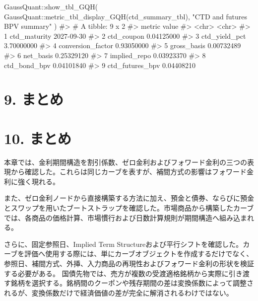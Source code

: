 \documentclass[
  letterpaper,
  DIV=11,
  numbers=noendperiod]{scrreprt}
\newenvironment{Shaded}{\begin{snugshade}}{\end{snugshade}}
\newcommand{\CommentTok}[1]{\textcolor[rgb]{0.37,0.37,0.37}{#1}}
\newcommand{\FunctionTok}[1]{\textcolor[rgb]{0.28,0.35,0.67}{#1}}
\newcommand{\NormalTok}[1]{\textcolor[rgb]{0.00,0.23,0.31}{#1}}
\newcommand{\SpecialCharTok}[1]{\textcolor[rgb]{0.37,0.37,0.37}{#1}}
\newcommand{\StringTok}[1]{\textcolor[rgb]{0.13,0.47,0.30}{#1}}
\begin{document}
\begin{Shaded}
\begin{Highlighting}[]
\NormalTok{GaussQuant}\SpecialCharTok{::}\FunctionTok{show\_tbl\_GQH}\NormalTok{(}
\NormalTok{  GaussQuant}\SpecialCharTok{::}\FunctionTok{metric\_tbl\_display\_GQH}\NormalTok{(ctd\_summary\_tbl),}
  \StringTok{"CTD and futures BPV summary"}
\NormalTok{)}
\CommentTok{\#\textgreater{} \# A tibble: 9 x 2}
\CommentTok{\#\textgreater{}   metric            value     }
\CommentTok{\#\textgreater{}   \textless{}chr\textgreater{}             \textless{}chr\textgreater{}     }
\CommentTok{\#\textgreater{} 1 ctd\_maturity      2027{-}09{-}30}
\CommentTok{\#\textgreater{} 2 ctd\_coupon        0.04125000}
\CommentTok{\#\textgreater{} 3 ctd\_yield\_pct     3.70000000}
\CommentTok{\#\textgreater{} 4 conversion\_factor 0.93050000}
\CommentTok{\#\textgreater{} 5 gross\_basis       0.00732489}
\CommentTok{\#\textgreater{} 6 net\_basis         0.25329120}
\CommentTok{\#\textgreater{} 7 implied\_repo      0.03923370}
\CommentTok{\#\textgreater{} 8 ctd\_bond\_bpv      0.04101840}
\CommentTok{\#\textgreater{} 9 ctd\_futures\_bpv   0.04408210}
\end{Highlighting}
\end{Shaded}

\section{9. まとめ}\label{ux307eux3068ux3081}

\section{10. まとめ}\label{ux307eux3068ux3081-1}

本章では、金利期間構造を割引係数、ゼロ金利およびフォワード金利の三つの表現から確認した。これらは同じカーブを表すが、補間方式の影響はフォワード金利に強く現れる。

また、ゼロ金利ノードから直接構築する方法に加え、預金と債券、ならびに預金とスワップを用いたブートストラップを確認した。市場商品から構築したカーブでは、各商品の価格計算、市場慣行および日数計算規則が期間構造へ組み込まれる。

さらに、固定参照日、Implied Term
Structureおよび平行シフトを確認した。カーブを評価へ使用する際には、単にカーブオブジェクトを作成するだけでなく、参照日、補間方式、外挿、入力商品の再現性およびフォワード金利の形状を検証する必要がある。
国債先物では、売方が複数の受渡適格銘柄から実際に引き渡す銘柄を選択する。銘柄間のクーポンや残存期間の差は変換係数によって調整されるが、変換係数だけで経済価値の差が完全に解消されるわけではない。
\end{document}

